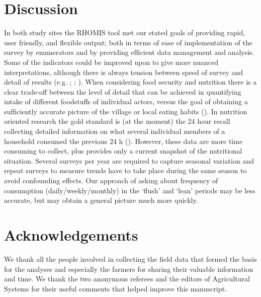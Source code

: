 \section{Discussion}

In both study sites the RHOMIS tool met our stated goals of providing rapid, user friendly, and ﬂexible output; both in terms of ease of implementation of the survey by enumerators and by providing efﬁcient data management and analysis. Some of the indicators could be improved upon to give more nuanced interpretations, although there is always tension between speed of survey and detail of results (e.g. \citealp{Mina2008}; \citealp{Coates2013188}; \citealp{DeWeerdt201536}). When considering food security and nutrition there is a clear trade-off between the level of detail that can be achieved in quantifying intake of different foodstuffs of individual actors, versus the goal of obtaining a sufﬁciently accurate picture of the village or local eating habits (\citealp{Kennedy2011}). In nutrition oriented research the gold standard is (at the moment) the 24 hour recall collecting detailed information on what several individual members of a household consumed the previous 24 h (\citealp{Coates2013188}). However, these data are more time consuming to collect, plus provides only a current snapshot of the nutritional situation. Several surveys per year are required to capture seasonal variation and repeat surveys to measure trends have to take place during the same season to avoid confounding effects. Our approach of asking about frequency of consumption (daily/weekly/monthly) in the `flush' and `lean' periods may be less accurate, but may obtain a general picture much more quickly.

\section{Acknowledgements}
We thank all the people involved in collecting the field data that formed the basis for the analyses and especially the farmers for sharing their valuable information and time. We thank the two anonymous referees and the editors of Agricultural Systems for their useful comments that helped improve this manuscript.
